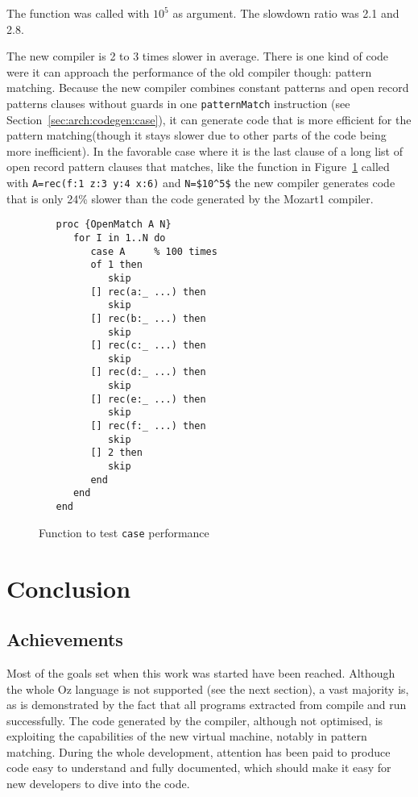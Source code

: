 \documentclass[a4paper]{memoir}
\begin{document}
The function was called with $10^5$ as argument.
The slowdown ratio was 2.1 and 2.8.


The new compiler is 2 to 3 times slower in average. There is one kind of code
were it can approach the performance of the old compiler though: pattern
matching. Because the new compiler combines constant patterns and open record
patterns clauses without guards in one \lstinline!patternMatch! instruction (see
Section~\ref{sec:arch:codegen:case}), it can generate code that
is more efficient for the pattern matching(though it stays slower due to other parts of the code being more
inefficient).
In the favorable case where it is the last clause of a long list of open record
pattern clauses that matches, like the function in
Figure~\ref{fig:perf:openmatch} called with \lstinline!A=rec(f:1 z:3 y:4 x:6)!
and \lstinline!N=$10^5$! the new compiler generates code that is only 24\% slower than the
code generated by the Mozart1 compiler.


\begin{figure}[h]
\begin{lstlisting}
   proc {OpenMatch A N}
      for I in 1..N do
         case A     % 100 times
         of 1 then
            skip
         [] rec(a:_ ...) then
            skip
         [] rec(b:_ ...) then
            skip
         [] rec(c:_ ...) then
            skip
         [] rec(d:_ ...) then
            skip
         [] rec(e:_ ...) then
            skip
         [] rec(f:_ ...) then
            skip
         [] 2 then
            skip
         end
      end
   end
\end{lstlisting}
\caption{Function to test \lstinline!case! performance}
\label{fig:perf:openmatch}
\end{figure}


\chapter{Conclusion}
\section{Achievements}
Most of the goals set when this work was started have been reached.
Although the whole Oz language is not supported (see the next section), a vast majority is, as is demonstrated by the fact that all programs extracted from \cite{CTMCP} compile and run successfully. The code generated by the compiler, although not optimised, is exploiting the capabilities of the new virtual machine, notably in pattern matching.  During the whole development, attention has been paid to produce code easy to understand and fully documented, which should make it easy for new developers to dive into the code.
\end{document}
